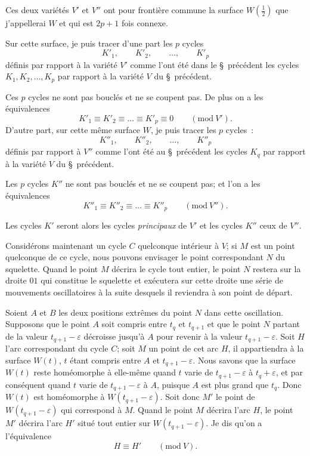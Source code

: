 \documentclass{article}
\begin{document}
Ces deux variétés $V'$ et $V''$ ont pour frontière commune la surface $W\left(\frac{1}{2}\right)$ que j'appellerai $W$ et qui est $2p + 1$ fois connexe.

Sur cette surface, je puis tracer d'une part les $p$ cycles
\[ K'_{1}, \qquad K'_{2}, \qquad \ldots, \qquad K'_{p} \]
définis par rapport à la variété $V'$ comme l'ont été dans le \S\ précédent les cycles $K_{1}, K_{2}, \ldots, K_{p}$ par rapport à la variété $V$ du \S\ précédent.

Ces $p$ cycles ne sont pas bouclés et ne se coupent pas. De plus on a les équivalences
\[ K'_{1} \equiv K'_{2} \equiv \ldots \equiv K'_{p} \equiv 0 \qquad (\text{mod}\ V'). \tag{1} \]
D'autre part, sur cette même surface $W$, je puis tracer les $p$ cycles~:
\[ K''_{1}, \qquad K''_{2}, \qquad \ldots, \qquad K''_{p} \]
définis par rapport à $V''$ comme l'ont été au \S\ précédent les cycles $K_{q}$ par rapport à la variété $V$ du \S\ précédent.


Les $p$ cycles $K''$ ne sont pas bouclés et ne se coupent pas; et l'on a les équivalences
\[ K''_{1} \equiv K''_{2} \equiv \ldots \equiv K''_{p} \qquad (\text{mod}\ V''). \tag{2} \]

Les cycles $K'$ seront alors les cycles \emph{principaux} de $V'$ et les cycles $K''$ ceux de $V''$.

Considérons maintenant un cycle $C$ quelconque intérieur à $V$; si $M$ est un point quelconque de ce cycle, nous pouvons envisager le point correspondant $N$ du squelette. Quand le point $M$ décrira le cycle tout entier, le point $N$ restera sur la droite $01$ qui constitue le squelette et exécutera sur cette droite une série de mouvements oscillatoires à la suite desquels il reviendra à son point de départ.

Soient $A$ et $B$ les deux positions extrêmes du point $N$ dans cette oscillation. Supposons que le point $A$ soit compris entre $t_{q}$ et $t_{q+1}$ et que le point $N$ partant de la valeur $t_{q+1} - \varepsilon$ décroisse jusqu'à $A$ pour revenir à la valeur $t_{q+1} - \varepsilon$. Soit $H$ l'arc correspondant du cycle $C$; soit $M$ un point de cet arc $H$, il appartiendra à la surface $W(t)$, $t$ étant compris entre $A$ et $t_{q+1} - \varepsilon$. Nous savons que la surface $W(t)$ reste homéomorphe à elle-même quand $t$ varie de $t_{q+1} - \varepsilon$ à $t_{q} + \varepsilon$, et par conséquent quand $t$ varie de $t_{q+1} - \varepsilon$ à $A$, puisque $A$ est plus grand que $t_{q}$. Donc $W(t)$ est homéomorphe à $W(t_{q+1} - \varepsilon)$. Soit donc $M'$ le point de $W(t_{q+1} - \varepsilon)$ qui correspond à $M$. Quand le point $M$ décrira l'arc $H$, le point $M'$ décrira l'arc $H'$ situé tout entier sur $W(t_{q+1} - \varepsilon)$. Je dis qu'on a l'équivalence
\[ H \equiv H' \qquad (\text{mod}\ V). \]
\end{document}
